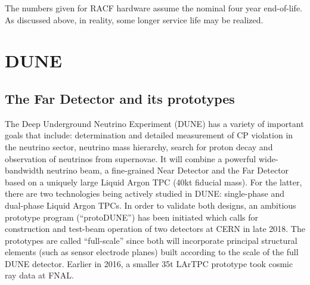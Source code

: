 \documentclass[pdftex,12pt,letter]{article}
\begin{document}
The numbers given for RACF hardware assume the nominal four year
end-of-life.
As discussed above, in reality, some longer service life may be
realized.

\pagebreak
\section{DUNE}
\subsection{The Far Detector and its prototypes}
The Deep Underground Neutrino Experiment (DUNE) has a variety of important goals that
include:
determination and detailed measurement of CP violation in the neutrino sector,
neutrino mass hierarchy, search for proton decay and observation of neutrinos from supernovae.
It will combine a powerful wide-bandwidth neutrino beam, a fine-grained Near Detector and
the Far Detector based on a uniquely large Liquid Argon TPC (40kt fiducial mass). For the latter,
there are two technologies being actively studied in DUNE: single-phase and dual-phase Liquid Argon TPCs.
In order to validate both designs, an ambitious prototype program (``protoDUNE'') has been initiated which calls
for construction and test-beam operation of two detectors at CERN in late 2018. The  prototypes are called ``full-scale''
since both will incorporate principal structural elements (such as sensor electrode planes) built according to the scale
of the full DUNE detector. Earlier in 2016, a smaller 35t LArTPC prototype took cosmic ray data at FNAL.
\end{document}

